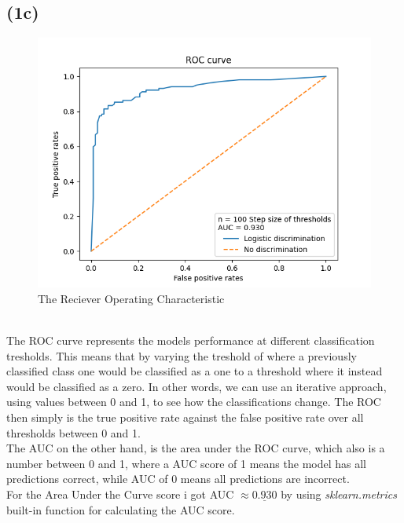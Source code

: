 \documentclass[12pt, letterpaper]{article}
\begin{document}
    \subsection*{(1c)}
      \begin{figure}[H]
        \caption{The Reciever Operating Characteristic}
        \centering
        \includegraphics[width=14cm]{ROC}
      \end{figure}\\
      The ROC curve represents the models performance at different classification tresholds. This means that by varying the treshold of where a previously classified class one would be classified as a one to a threshold where it instead would be classified as a zero. In other words, we can use an iterative approach, using values between 0 and 1, to see how the classifications change. The ROC then simply is the true positive rate against the false positive rate over all thresholds between 0 and 1.\\
      The AUC on the other hand, is the area under the ROC curve, which also is a number between 0 and 1, where a AUC score of 1 means the model has all predictions correct, while AUC of 0 means all predictions are incorrect.\\

      For the Area Under the Curve score i got AUC $ \approx \underline{0.930}$ by using \textit{sklearn.metrics} built-in function for calculating the AUC score.
\end{document}
